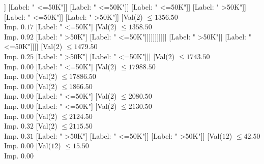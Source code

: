 \documentclass[margin=10pt]{standalone}
\begin{document}
\begin{forest}
																			[Val($2$) $ \leq 1298.50$ \\ Imp. $0.08$
																				[Val($2$) $ \leq 1281.50$ \\ Imp. $0.04$
																					[Val($2$) $ \leq 1270.50$ \\ Imp. $0.03$
																						[Val($2$) $ \leq 1214.50$ \\ Imp. $0.04$
																							[Val($2$) $ \leq 1212.50$ \\ Imp. $0.04$
																								[Val($2$) $ \leq 1189.50$ \\ Imp. $0.09$
																									[Val($2$) $ \leq 1176.50$ \\ Imp. $0.17$
																										[Label: " <=50K"]
																										[Label: " >50K"]]
																									[Label: " <=50K"]]
																								[Label: " <=50K"]]
																							[Label: " <=50K"]]
																						[Label: " >50K"]]
																					[Label: " <=50K"]]
																				[Label: " >50K"]]
																			[Val($2$) $ \leq 1356.50$ \\ Imp. $0.17$
																				[Label: " <=50K"]
																				[Val($2$) $ \leq 1358.50$ \\ Imp. $0.92$
																					[Label: " >50K"]
																					[Label: " <=50K"]]]]]]]]]]]
											[Label: " >50K"]]
										[Label: " <=50K"]]]]
							[Val($2$) $ \leq 1479.50$ \\ Imp. $0.25$
								[Label: " >50K"]
								[Label: " <=50K"]]]
						[Val($2$) $ \leq 1743.50$ \\ Imp. $0.00$
							[Label: " <=50K"]
							[Val($2$) $ \leq 17988.50$ \\ Imp. $0.00$
								[Val($2$) $ \leq 17886.50$ \\ Imp. $0.00$
									[Val($2$) $ \leq 1866.50$ \\ Imp. $0.00$
										[Label: " <=50K"]
										[Val($2$) $ \leq 2080.50$ \\ Imp. $0.00$
											[Label: " <=50K"]
											[Val($2$) $ \leq 2130.50$ \\ Imp. $0.00$
												[Val($2$) $ \leq 2124.50$ \\ Imp. $0.32$
													[Val($2$) $ \leq 2115.50$ \\ Imp. $0.31$
														[Label: " >50K"]
														[Label: " <=50K"]]
													[Label: " >50K"]]
												[Val($12$) $ \leq 42.50$ \\ Imp. $0.00$
													[Val($12$) $ \leq 15.50$ \\ Imp. $0.00$

\end{forest}
\end{document}
